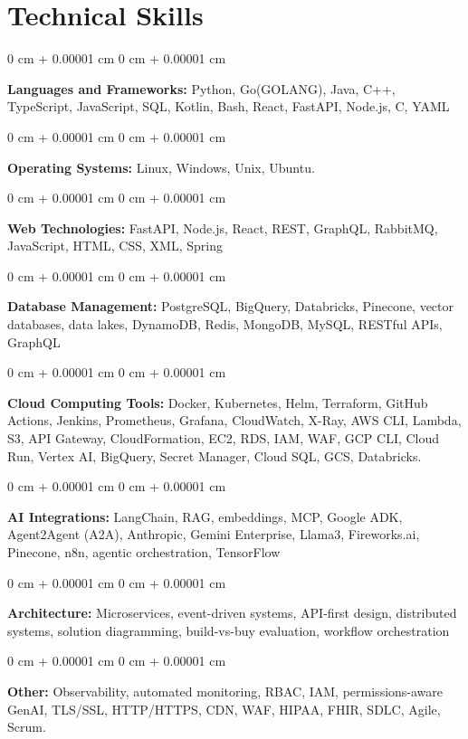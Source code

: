 \documentclass[10pt, letterpaper]{article}
\newenvironment{onecolentry}{
    \begin{adjustwidth}{
        0 cm + 0.00001 cm
    }{
        0 cm + 0.00001 cm
    }
}{
    \end{adjustwidth}
} %
\begin{document}
    \vspace{2 pt }

    \section{Technical Skills}
    \vspace{2 pt }
    \begin{onecolentry}
    \textbf{Languages and Frameworks:} Python, Go(GOLANG), Java, C++, TypeScript, JavaScript, SQL, Kotlin, Bash, React, FastAPI, Node.js, C, YAML
    \end{onecolentry}
    \begin{onecolentry}
        \textbf{Operating Systems:} Linux, Windows, Unix, Ubuntu.
    \end{onecolentry}
    \begin{onecolentry}
         \textbf{Web Technologies:} FastAPI, Node.js, React, REST, GraphQL, RabbitMQ, JavaScript, HTML, CSS, XML, Spring
    \end{onecolentry}
    \begin{onecolentry}
        \textbf{Database Management:} PostgreSQL, BigQuery, Databricks, Pinecone, vector databases, data lakes, DynamoDB, Redis, MongoDB, MySQL, RESTful APIs, GraphQL
    \end{onecolentry}
    \begin{onecolentry}
        \textbf{Cloud Computing Tools:}
Docker, Kubernetes, Helm, Terraform, GitHub Actions, Jenkins, Prometheus, Grafana, CloudWatch, X-Ray, AWS CLI, Lambda, S3, API Gateway, CloudFormation, EC2, RDS, IAM, WAF, GCP CLI, Cloud Run, Vertex AI, BigQuery, Secret Manager, Cloud SQL, GCS, Databricks.
    \end{onecolentry}
    \begin{onecolentry}
         \textbf{AI Integrations:} LangChain, RAG, embeddings, MCP, Google ADK, Agent2Agent (A2A), Anthropic, Gemini Enterprise, Llama3, Fireworks.ai, Pinecone, n8n, agentic orchestration, TensorFlow
    \end{onecolentry}
    \begin{onecolentry}
        \textbf{Architecture:} Microservices, event-driven systems, API-first design, distributed systems, solution diagramming, build-vs-buy evaluation, workflow orchestration
    \end{onecolentry}
        \begin{onecolentry}
     \textbf{Other:} Observability, automated monitoring, RBAC, IAM, permissions-aware GenAI, TLS/SSL, HTTP/HTTPS, CDN, WAF, HIPAA, FHIR, SDLC, Agile, Scrum.
    \end{onecolentry}
\end{document}
